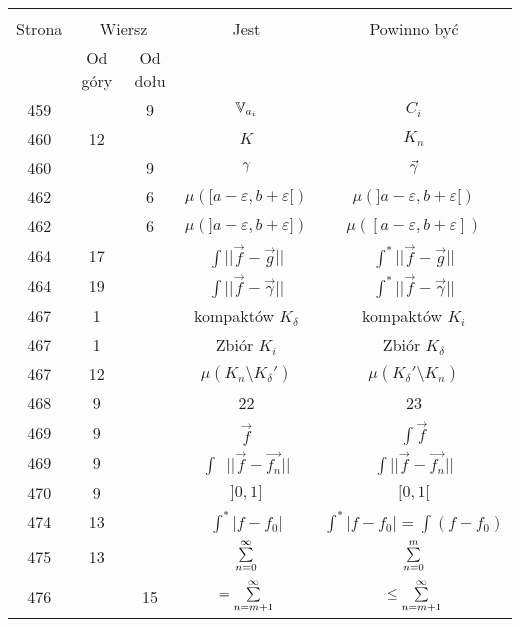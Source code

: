\documentclass[a4paper,11pt]{article}
\newcommand{\V}{\mb{V}}
\newcommand{\veps}{\varepsilon}
\begin{document}
\begin{center}
  \begin{tabular}{|c|c|c|c|c|}
    \hline
    & \multicolumn{2}{c|}{} & & \\
    Strona & \multicolumn{2}{c|}{Wiersz}& Jest & Powinno być \\ \cline{2-3}
    & Od góry & Od dołu &  &  \\ \hline
    459 & &  9 & $\V_{ a_{ i } }$ & $C_{ i }$ \\
    460 & 12 & & $K$ & $K_{ n }$ \\
    460 & &  9 & $\gamma$ & $\vec{ \gamma }$ \\
    462 & &  6 & $\mu( [ a - \veps, b + \veps [ )$
           & $\mu( ] a - \veps, b + \veps [ )$ \\
    462 & &  6 & $\mu( ] a - \veps, b + \veps ] )$
           & $\mu( [ a - \veps, b + \veps ] )$ \\
    464 & 17 & & $\int || \vec{ f } - \vec{ g } ||$
           & $\int^{ * } || \vec{ f } - \vec{ g } ||$ \\
    464 & 19 & & $\int || \vec{ f } - \vec{ \gamma } ||$
           & $\int^{ * } || \vec{ f } - \vec{ \gamma } ||$ \\
    467 &  1 & & kompaktów $K_{ \delta }$ & kompaktów $K_{ i }$ \\
    467 &  1 & & Zbiór $K_{ i }$ & Zbiór $K_{ \delta }$ \\
    467 & 12 & & $\mu( K_{ n } \setminus K_{ \delta }' )$
           & $\mu( K_{ \delta }' \setminus K_{ n } )$ \\
    468 &  9 & & 22 & 23 \\
    469 &  9 & & $\vec{ f }$ & $\int \vec{ f }$ \\
    469 &  9 & & $\int\:\; || \vec{ f } - \vec{ f_{ n } } ||$
           & $\int || \vec{ f } - \vec{ f_{ n } } ||$ \\
    470 &  9 & & $] 0, 1 ]$ & $[ 0, 1 [$ \\
    474 & 13 & & $\int^{ * } | f - f_{ 0 } |$ & $\int^{ * } | f - f_{ 0 } |
                                                = \int ( f - f_{ 0 } )$ \\
    475 & 13 & &  $\sum\limits_{ n = 0 }^{ \infty }$ & $\sum\limits_{ n = 0 }^{ m }$ \\
    476 & & 15 & $= \sum\limits^{ \infty }_{ n = m + 1 }$
           & $\leq \sum\limits^{ \infty }_{ n = m + 1 }$ \\

\end{tabular}
\end{center}
\end{document}
